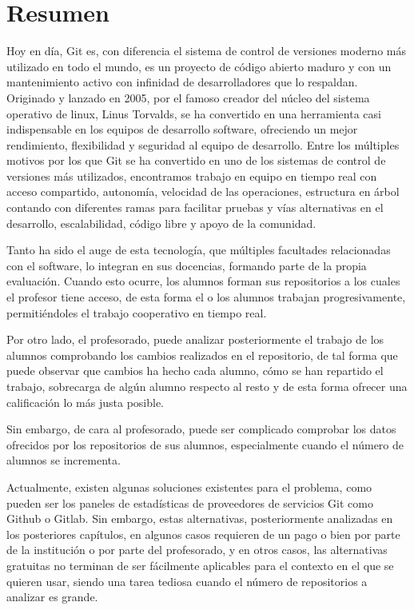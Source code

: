 \chapter*{Resumen\label{00summary}}


Hoy en día, Git\cite{EDteam,CodicesSoftware,Uqbar,Sivsa} es, con
diferencia el sistema de control de versiones moderno más utilizado en
todo el mundo, es un proyecto de código abierto maduro y con un
mantenimiento activo con infinidad de desarrolladores que lo
respaldan. Originado y lanzado en 2005, por el famoso creador del
núcleo del sistema operativo de linux, Linus Torvalds, se ha
convertido en una herramienta casi indispensable en los equipos de
desarrollo software, ofreciendo un mejor rendimiento, flexibilidad y
seguridad al equipo de desarrollo. Entre los múltiples motivos por los
que Git se ha convertido en uno de los sistemas de control de
versiones más utilizados, encontramos trabajo en equipo en tiempo real
con acceso compartido, autonomía, velocidad de las operaciones,
estructura en árbol contando con diferentes ramas para facilitar
pruebas y vías alternativas en el desarrollo, escalabilidad, código
libre y apoyo de la comunidad.

Tanto ha sido el auge de esta tecnología, que múltiples facultades
relacionadas con el software, lo integran en sus docencias, formando
parte de la propia evaluación. Cuando esto ocurre, los alumnos forman
sus repositorios a los cuales el profesor tiene acceso, de esta forma
el o los alumnos trabajan progresivamente, permitiéndoles el trabajo
cooperativo en tiempo real.

Por otro lado, el profesorado, puede analizar posteriormente el
trabajo de los alumnos comprobando los cambios realizados en el
repositorio, de tal forma que puede observar que cambios ha hecho cada
alumno, cómo se han repartido el trabajo, sobrecarga de algún alumno
respecto al resto y de esta forma ofrecer una calificación lo más
justa posible.

Sin embargo, de cara al profesorado, puede ser complicado comprobar
los datos ofrecidos por los repositorios de sus alumnos, especialmente
cuando el número de alumnos se incrementa.

Actualmente, existen algunas soluciones existentes para el problema,
como pueden ser los paneles de estadísticas de proveedores de
servicios Git como Github o Gitlab. Sin embargo, estas alternativas,
posteriormente analizadas en los posteriores capítulos, en algunos
casos requieren de un pago o bien por parte de la institución o por
parte del profesorado, y en otros casos, las alternativas gratuitas no
terminan de ser fácilmente aplicables para el contexto en el que se
quieren usar, siendo una tarea tediosa cuando el número de
repositorios a analizar es grande.

